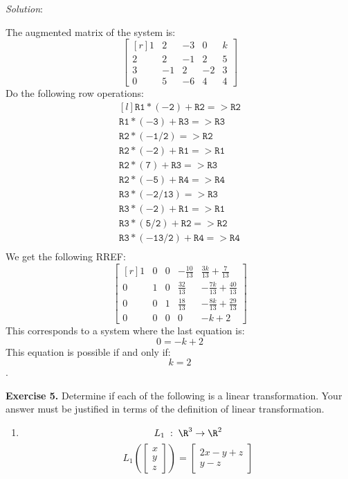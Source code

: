 \documentclass[12pt]{article}
\begin{document}
\emph{Solution}:

The augmented matrix of the system is:
\[
\left[\begin{matrix*}[r]1 & 2 & -3 & 0 & k\\2 & 2 & -1 & 2 & 5\\3 & -1 & 2 & -2 & 3\\0 & 5 & -6 & 4 & 4\end{matrix*}\right]
\]
Do the following row operations:
\[
\begin{matrix*}[l]
\mathtt{R1*(-2)+R2=>R2}\\
\mathtt{R1*(-3)+R3=>R3}\\
\mathtt{R2*(-1/2)=>R2}\\
\mathtt{R2*(-2)+R1=>R1}\\
\mathtt{R2*(7)+R3=>R3}\\
\mathtt{R2*(-5)+R4=>R4}\\
\mathtt{R3*(-2/13)=>R3}\\
\mathtt{R3*(-2)+R1=>R1}\\
\mathtt{R3*(5/2)+R2=>R2}\\
\mathtt{R3*(-13/2)+R4=>R4}\\
\end{matrix*}
\]
We get the following RREF:
\[
\left[\begin{matrix*}[r]1 & 0 & 0 & - \frac{10}{13} & \frac{3 k}{13} + \frac{7}{13}\\0 & 1 & 0 & \frac{32}{13} & - \frac{7 k}{13} + \frac{40}{13}\\0 & 0 & 1 & \frac{18}{13} & - \frac{8 k}{13} + \frac{29}{13}\\0 & 0 & 0 & 0 & - k + 2\end{matrix*}\right]
\]
This corresponds to a system where the last equation is:
\[
0=-k+2
\]
This equation is possible if and only if: \[k=2\].
\proofend

\textbf{Exercise 5.} Determine if each of the following is a linear transformation. Your answer must be justified in terms of the definition of linear transformation.

\begin{enumerate}
\item
\[
L_1\;:\;\R^3\to\R^2
\]
\[
L_1\left(\begin{bmatrix}x\\y\\z\end{bmatrix}\right)=\begin{bmatrix}2x-y+z\\y-z\end{bmatrix}
\]
\end{enumerate}
\end{document}
